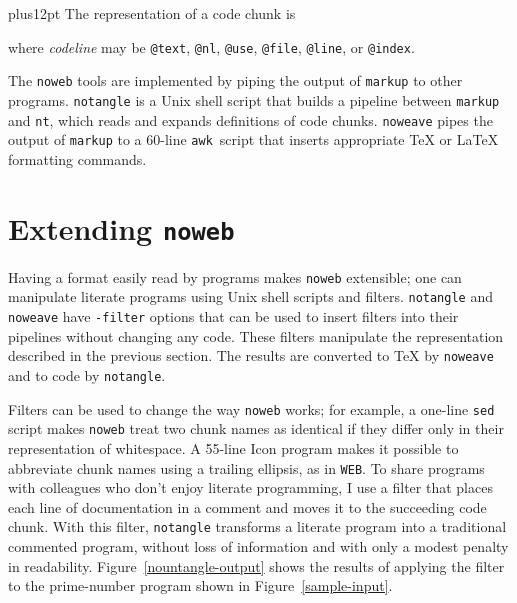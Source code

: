 \vskip0pt plus12pt
The representation of a code chunk is
\begin{quote}
\leavevmode{}
\end{quote}
where {\it codeline} may be {\tt @text}, {\tt @nl}, {\tt @use}, 
{\tt @file}, {\tt @line}, or {\tt @index}.

The \verb+noweb+ tools are implemented by piping the output of
\verb+markup+ to other programs.
\verb+notangle+ is a Unix shell script that builds a
pipeline between \verb+markup+ and \verb+nt+, which reads
and expands definitions of code chunks.
\verb+noweave+ pipes the output of \verb+markup+ to a 60-line
\verb+awk+~script that inserts appropriate {\TeX} or {\LaTeX}
formatting commands.

\section{Extending {\tt noweb}}

Having a format easily read by programs makes {\tt noweb} extensible;
one can manipulate literate programs using Unix shell scripts and
filters.
{\tt notangle} and {\tt noweave} have {\tt -filter} options that can
be used to insert filters into their pipelines without changing any
code.
These filters manipulate the representation described in the previous
section.
The results are converted to {\TeX} by {\tt noweave} and to code by
{\tt notangle}.


Filters can be used to change the way {\tt noweb} works; for example,
a one-line {\tt sed} script makes {\tt noweb} treat two chunk names as
identical if they differ only in their representation of whitespace.
A 55-line Icon program makes it possible to abbreviate chunk names
using a trailing ellipsis, as in {\tt WEB}.
To share programs with colleagues who don't enjoy literate
programming, I use a filter that
places each line of documentation in a comment and moves it to
the succeeding code chunk.  
With this filter, \verb+notangle+
transforms a literate 
program into a traditional commented program, without loss of
information and with only a modest penalty in readability.
Figure~\ref{nountangle-output} shows the results of applying
the filter to the prime-number program shown in
Figure~\ref{sample-input}. 




